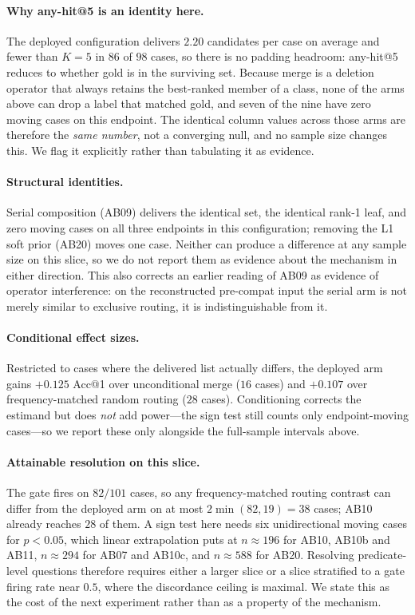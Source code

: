 \paragraph{Why any-hit@5 is an identity here.}
The deployed configuration delivers $2.20$ candidates per case on average and fewer than $K{=}5$ in $86$ of $98$ cases, so there is no padding headroom: any-hit@5 reduces to whether gold is in the surviving set.
Because merge is a deletion operator that always retains the best-ranked member of a class, none of the arms above can drop a label that matched gold, and seven of the nine have zero moving cases on this endpoint.
The identical column values across those arms are therefore the \emph{same number}, not a converging null, and no sample size changes this.
We flag it explicitly rather than tabulating it as evidence.

\paragraph{Structural identities.}
Serial composition (AB09) delivers the identical set, the identical rank-1 leaf, and zero moving cases on all three endpoints in this configuration; removing the L1 soft prior (AB20) moves one case.
Neither can produce a difference at any sample size on this slice, so we do not report them as evidence about the mechanism in either direction.
This also corrects an earlier reading of AB09 as evidence of operator interference: on the reconstructed pre-compat input the serial arm is not merely similar to exclusive routing, it is indistinguishable from it.

\paragraph{Conditional effect sizes.}
Restricted to cases where the delivered list actually differs, the deployed arm gains $+0.125$ Acc@1 over unconditional merge ($16$ cases) and $+0.107$ over frequency-matched random routing ($28$ cases).
Conditioning corrects the estimand but does \emph{not} add power---the sign test still counts only endpoint-moving cases---so we report these only alongside the full-sample intervals above.

\paragraph{Attainable resolution on this slice.}
The gate fires on $82/101$ cases, so any frequency-matched routing contrast can differ from the deployed arm on at most $2\min(82,19)=38$ cases; AB10 already reaches $28$ of them.
A sign test here needs six unidirectional moving cases for $p<0.05$, which linear extrapolation puts at $n\approx196$ for AB10, AB10b and AB11, $n\approx294$ for AB07 and AB10c, and $n\approx588$ for AB20.
Resolving predicate-level questions therefore requires either a larger slice or a slice stratified to a gate firing rate near $0.5$, where the discordance ceiling is maximal.
We state this as the cost of the next experiment rather than as a property of the mechanism.

